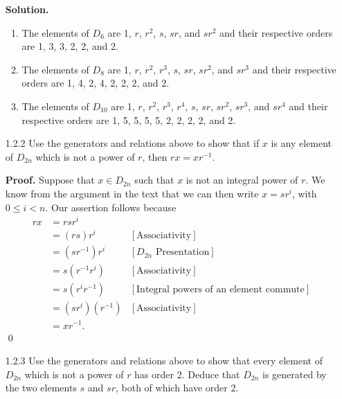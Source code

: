 \begin{enumerate}
      \textbf{Solution.}
      
      \begin{enumerate}
         \item The elements of $D_6$ are 1, $r$, $r^2$, $s$, $sr$, and $sr^2$
               and their respective orders are 1, 3, 3, 2, 2, and 2.
         \item The elements of $D_8$ are 1, $r$, $r^2$, $r^3$, $s$, $sr$,
               $sr^2$, and $sr^3$ and their respective orders are 1, 4, 2, 4, 2,
               2, 2, and 2.
         \item The elements of $D_{10}$ are 1, $r$, $r^2$, $r^3$, $r^4$, $s$,
               $sr$, $sr^2$, $sr^3$, and $sr^4$ and their respective orders are
               1, 5, 5, 5, 5, 2, 2, 2, 2, and 2.
      \end{enumerate}
   \item[1.2.2]   Use the generators and relations above to show that if $x$ is
                  any element of $D_{2n}$ which is not a power of $r$, then
                  $rx = xr^{-1}$. 
                  
      \textbf{Proof.} Suppose that $x \in D_{2n}$ such that $x$ is not an
      integral power of $r$. We know from the argument in the text that we can
      then write $x = sr^i$, with $0 \le i < n$. Our assertion follows
      because
      \begin{align*}
         rx &= rsr^i \\
            &= (rs)r^i &[\text{Associativity}] \\
            &= (sr^{-1})r^i &[D_{2n}\text{ Presentation}] \\
            &= s(r^{-1}r^i) &[\text{Associativity}] \\
            &= s(r^ir^{-1}) &[\text{Integral powers of an element commute}] \\
            &= (sr^i)(r^{-1}) &[\text{Associativity}] \\
            &= xr^{-1}.
      \end{align*}
      \qed
   \item[1.2.3]   Use the generators and relations above to show that every
                  element of $D_{2n}$ which is not a power of $r$ has order 2.
                  Deduce that $D_{2n}$ is generated by the two elements $s$ and
                  $sr$, both of which have order 2.
                  

\end{enumerate}
